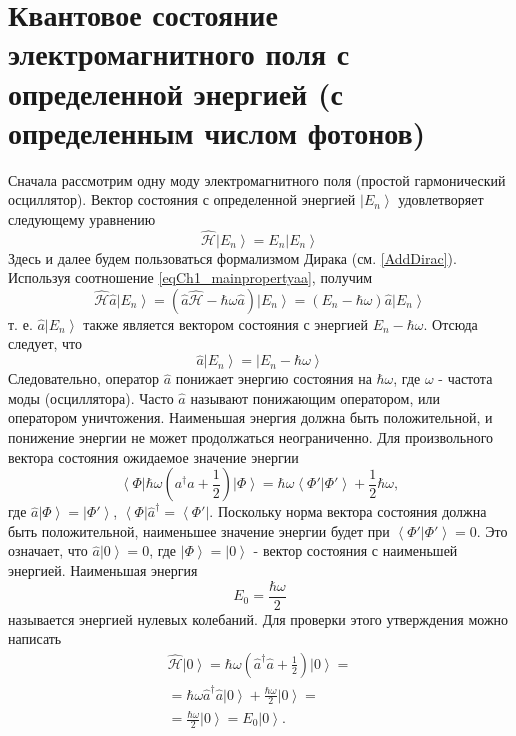 \section{Квантовое состояние электромагнитного поля с определенной
  энергией (с определенным числом фотонов)}
Сначала рассмотрим одну моду электромагнитного поля (простой
гармонический осциллятор). Вектор состояния с определенной энергией
$\left|E_n\right>$ удовлетворяет следующему уравнению
\begin{equation}
\hat{\mathcal{H}} \left|E_n\right> = E_n \left|E_n\right>
\end{equation}
Здесь и далее будем пользоваться формализмом Дирака (см. 
\autoref{AddDirac}). Используя соотношение \eqref{eqCh1_mainpropertyaa},
получим 
\begin{equation}
\hat{\mathcal{H}} \hat{a}\left|E_n\right> = 
\left(\hat{a}\hat{\mathcal{H}} -
\hbar\omega\hat{a}\right)\left|E_n\right> =
\left(E_n - \hbar \omega\right)\hat{a}\left|E_n\right>
\end{equation}
т. е. $\hat{a}\left|E_n\right>$ также является вектором состояния с
энергией $E_n - \hbar \omega$.  Отсюда следует, что
\[
\hat{a}\left|E_n\right> = \left|E_n - \hbar \omega \right>
\] 
Следовательно, оператор $\hat{a}$ понижает энергию состояния на $\hbar
\omega$,  где $\omega$ - частота моды (осциллятора). Часто $\hat{a}$
называют понижающим оператором, или оператором уничтожения. Наименьшая
энергия должна быть положительной, и понижение энергии не может
продолжаться неограниченно. Для произвольного вектора состояния
ожидаемое значение энергии 
\begin{equation}
\left< \Phi \right| \hbar \omega \left({a}^{\dag} {a}  +
\frac{1}{2}\right)\left| \Phi \right> = 
\hbar \omega \left< \Phi' \right. \left| \Phi' \right> + \frac{1}{2}
\hbar \omega,
\end{equation}
где  $\hat{a} \left| \Phi \right> = \left| \Phi' \right>$,  
$\left< \Phi \right| \hat{a}^{\dag}  = \left< \Phi' \right|$.  Поскольку
норма вектора состояния должна быть положительной, 
наименьшее значение энергии будет при  
\(
\left< \Phi' \right. \left| \Phi' \right> = 0.
\)
Это означает, что $\hat{a}\left|0\right> = 0$,  где
$\left|\Phi\right> = \left|0\right>$ -  вектор состояния с наименьшей
энергией. Наименьшая энергия  
\begin{equation}
E_0 = \frac{\hbar \omega}{2}
\end{equation}
называется энергией нулевых колебаний. Для проверки этого утверждения
можно написать
\begin{eqnarray}
\hat{\mathcal{H}} \left|0\right> = 
\hbar \omega \left(\hat{a}^{\dag} \hat{a} +
\frac{1}{2}\right) \left|0\right> = 
\nonumber \\
= 
\hbar \omega \hat{a}^{\dag} \hat{a} \left|0\right> +
\frac{\hbar \omega}{2}\left|0\right> =
\nonumber \\
= \frac{\hbar \omega}{2} \left|0\right> = 
E_0 \left|0\right>.
\label{eqProper0state}
\end{eqnarray}


